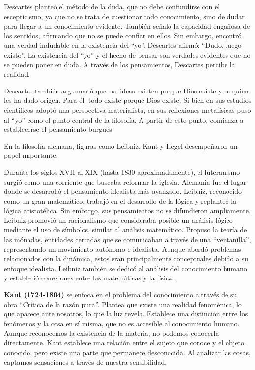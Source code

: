 \documentclass[
  letterpaper,
  DIV=11,
  numbers=noendperiod]{scrartcl}
\begin{document}
Descartes planteó el método de la duda, que no debe confundirse con el
escepticismo, ya que no se trata de cuestionar todo conocimiento, sino
de dudar para llegar a un conocimiento evidente. También señaló la
capacidad engañosa de los sentidos, afirmando que no se puede confiar en
ellos. Sin embargo, encontró una verdad indudable en la existencia del
``yo''. Descartes afirmó: ``Dudo, luego existo''. La existencia del
``yo'' y el hecho de pensar son verdades evidentes que no se pueden
poner en duda. A través de los pensamientos, Descartes percibe la
realidad.

Descartes también argumentó que sus ideas existen porque Dios existe y
es quien les ha dado origen. Para él, todo existe porque Dios existe. Si
bien en sus estudios científicos adoptó una perspectiva materialista, en
sus reflexiones metafísicas puso al ``yo'' como el punto central de la
filosofía. A partir de este punto, comienza a establecerse el
pensamiento burgués.

En la filosofía alemana, figuras como Leibniz, Kant y Hegel desempeñaron
un papel importante.

Durante los siglos XVII al XIX (hasta 1830 aproximadamente), el
luteranismo surgió como una corriente que buscaba reformar la iglesia.
Alemania fue el lugar donde se desarrolló el pensamiento idealista más
avanzado. Leibniz, reconocido como un gran matemático, trabajó en el
desarrollo de la lógica y replanteó la lógica aristotélica. Sin embargo,
sus pensamientos no se difundieron ampliamente. Leibniz promovió un
racionalismo que consideraba posible un análisis lógico mediante el uso
de símbolos, similar al análisis matemático. Propuso la teoría de las
mónadas, entidades cerradas que se comunicaban a través de una
``ventanilla'', representando un movimiento autónomo e idealista. Aunque
abordó problemas relacionados con la dinámica, estos eran principalmente
conceptuales debido a su enfoque idealista. Leibniz también se dedicó al
análisis del conocimiento humano y estableció conexiones entre las
matemáticas y la física.

\textbf{Kant (1724-1804)} se enfoca en el problema del conocimiento a
través de su obra ``Crítica de la razón pura''. Plantea que existe una
realidad fenoménica, lo que aparece ante nosotros, lo que la luz revela.
Establece una distinción entre los fenómenos y la cosa en sí misma, que
no es accesible al conocimiento humano. Aunque reconocemos la existencia
de la materia, no podemos conocerla directamente. Kant establece una
relación entre el sujeto que conoce y el objeto conocido, pero existe
una parte que permanece desconocida. Al analizar las cosas, captamos
sensaciones a través de nuestra sensibilidad.
\end{document}
